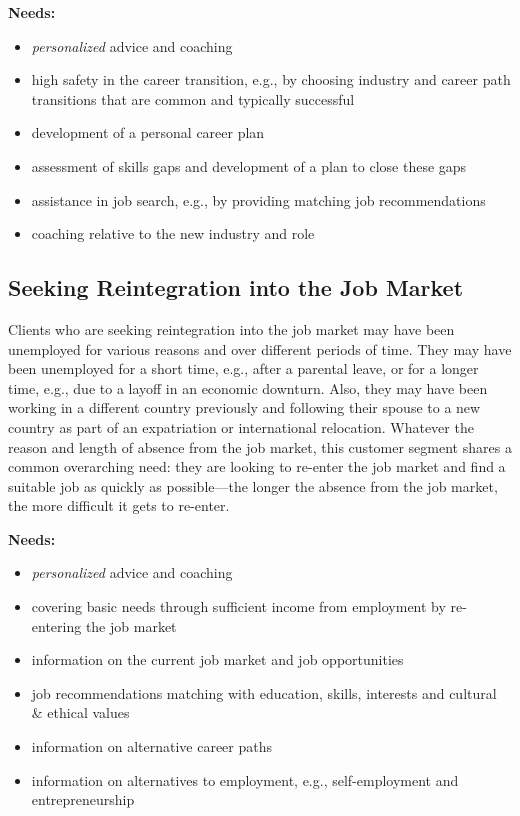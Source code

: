 \noindent\textbf{Needs:}
\begin{itemize}
    \item \textit{personalized} advice and coaching
    \item high safety in the career transition, e.g., by choosing industry and career path transitions that are common
        and typically successful
    \item development of a personal career plan
    \item assessment of skills gaps and development of a plan to close these gaps
    \item assistance in job search, e.g., by providing matching job recommendations
    \item coaching relative to the new industry and role
\end{itemize}
\vspace*{0.1cm} 

\subsection{Seeking Reintegration into the Job Market}

Clients who are seeking reintegration into the job market may have been unemployed for various reasons and over
different periods of time. They may have been unemployed for a short time, e.g., after a parental leave, or for
a longer time, e.g., due to a layoff in an economic downturn. Also, they may have been working in a different
country previously and following their spouse to a new country as part of an expatriation or international
relocation. Whatever the reason and length of absence from the job market, this customer segment shares a
common overarching need: they are looking to re-enter the job market and find a suitable job as quickly as
possible---the longer the absence from the job market, the more difficult it gets to re-enter.
\newline

\noindent\textbf{Needs:}
\begin{itemize}
    \item \textit{personalized} advice and coaching
    \item covering basic needs through sufficient income from employment by re-entering the job market
    \item information on the current job market and job opportunities
    \item job recommendations matching with education, skills, interests and cultural \& ethical values
    \item information on alternative career paths
    \item information on alternatives to employment, e.g., self-employment and entrepreneurship
\end{itemize}

